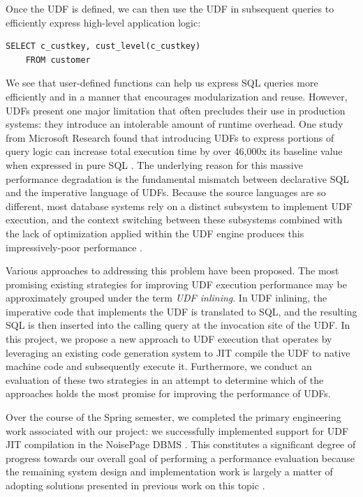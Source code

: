 \documentclass{vldb}
\begin{document}
Once the UDF is defined, we can then use the UDF in subsequent queries to efficiently express high-level application logic:

\begin{lstlisting}
SELECT c_custkey, cust_level(c_custkey)
    FROM customer
\end{lstlisting}

We see that user-defined functions can help us express SQL queries more efficiently and in a manner that encourages modularization and reuse. However, UDFs present one major limitation that often precludes their use in production systems: they introduce an intolerable amount of runtime overhead. One study from Microsoft Research found that introducing UDFs to express portions of query logic can increase total execution time by over 46,000x its baseline value when expressed in pure SQL \cite{froid}. The underlying reason for this massive performance degradation is the fundamental mismatch between declarative SQL and the imperative language of UDFs. Because the source languages are so different, most database systems rely on a distinct subsystem to implement UDF execution, and the context switching between these subsystems combined with the lack of optimization applied within the UDF engine produces this impressively-poor performance \cite{froid}.

Various approaches to addressing this problem have been proposed. The most promising existing strategies for improving UDF execution performance may be approximately grouped under the term \textit{UDF inlining}. In UDF inlining, the imperative code that implements the UDF is translated to SQL, and the resulting SQL is then inserted into the calling query at the invocation site of the UDF. In this project, we propose a new approach to UDF execution that operates by leveraging an existing code generation system to JIT compile the UDF to native machine code and subsequently execute it. Furthermore, we conduct an evaluation of these two strategies in an attempt to determine which of the approaches holds the most promise for improving the performance of UDFs.

Over the course of the Spring semester, we completed the primary engineering work associated with our project: we successfully implemented support for UDF JIT compilation in the NoisePage DBMS \cite{noisepage}. This constitutes a significant degree of progress towards our overall goal of performing a performance evaluation because the remaining system design and implementation work is largely a matter of adopting solutions presented in previous work on this topic \cite{froid, apfel, aggify}. 
\end{document}
